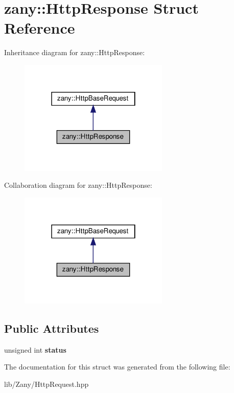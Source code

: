 \hypertarget{structzany_1_1_http_response}{}\section{zany\+:\+:Http\+Response Struct Reference}
\label{structzany_1_1_http_response}


Inheritance diagram for zany\+:\+:Http\+Response\+:
\nopagebreak
\begin{figure}[H]
\begin{center}
\leavevmode
\includegraphics[width=202pt]{structzany_1_1_http_response__inherit__graph}
\end{center}
\end{figure}


Collaboration diagram for zany\+:\+:Http\+Response\+:
\nopagebreak
\begin{figure}[H]
\begin{center}
\leavevmode
\includegraphics[width=202pt]{structzany_1_1_http_response__coll__graph}
\end{center}
\end{figure}
\subsection*{Public Attributes}
\begin{DoxyCompactItemize}
\item 
\mbox{\label{structzany_1_1_http_response_a7fd10e2ff82064b3932a0f3b99fb0580}} 
unsigned int {\bfseries status}
\end{DoxyCompactItemize}


The documentation for this struct was generated from the following file\+:\begin{DoxyCompactItemize}
\item 
lib/\+Zany/Http\+Request.\+hpp\end{DoxyCompactItemize}
